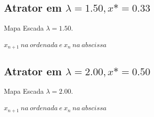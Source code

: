 \documentclass[pdftex,12pt,a4paper]{article}
\begin{document}
\begin{figure}
\subsection{Atrator em $\lambda = 1.50, x* = 0.33$}
\centering
\caption{Mapa Escada $\lambda = 1.50$.}
\caption*{$x_{n+1}\ na\ ordenada\ e\ x_{n}\ na\ abscissa$ }
\end{figure}
\pagebreak
\newpage

\begin{figure}
\subsection{Atrator em $\lambda = 2.00, x* = 0.50$}
\centering
\caption{Mapa Escada $\lambda = 2.00$.}
\caption*{$x_{n+1}\ na\ ordenada\ e\ x_{n}\ na\ abscissa$ }
\end{figure}
\end{document}
